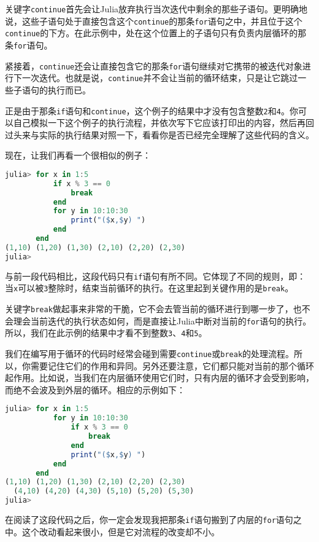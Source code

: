 关键字\verb`continue`首先会让Julia放弃执行当次迭代中剩余的那些子语句。更明确地说，这些子语句处于直接包含这个\verb`continue`的那条\verb`for`语句之中，并且位于这个\verb`continue`的下方。在此示例中，处在这个位置上的子语句只有负责内层循环的那条\verb`for`语句。

紧接着，\verb`continue`还会让直接包含它的那条\verb`for`语句继续对它携带的被迭代对象进行下一次迭代。也就是说，\verb`continue`并不会让当前的循环结束，只是让它跳过一些子语句的执行而已。

正是由于那条\verb`if`语句和\verb`continue`，这个例子的结果中才没有包含整数\verb`2`和\verb`4`。你可以自己模拟一下这个例子的执行流程，并依次写下它应该打印出的内容，然后再回过头来与实际的执行结果对照一下，看看你是否已经完全理解了这些代码的含义。

现在，让我们再看一个很相似的例子：
\begin{lstlisting}[language=julia]
julia> for x in 1:5
           if x % 3 == 0
               break
           end
           for y in 10:10:30
               print("($x,$y) ")
           end
       end
(1,10) (1,20) (1,30) (2,10) (2,20) (2,30) 
julia> 
\end{lstlisting}

与前一段代码相比，这段代码只有\verb`if`语句有所不同。它体现了不同的规则，即：当\verb`x`可以被\verb`3`整除时，结束当前循环的执行。在这里起到关键作用的是\verb`break`。

关键字\verb`break`做起事来非常的干脆，它不会去管当前的循环进行到哪一步了，也不会理会当前迭代的执行状态如何，而是直接让Julia中断对当前的\verb`for`语句的执行。所以，我们在此示例的结果中才看不到整数\verb`3`、\verb`4`和\verb`5`。

我们在编写用于循环的代码时经常会碰到需要\verb`continue`或\verb`break`的处理流程。所以，你需要记住它们的作用和异同。另外还要注意，它们都只能对当前的那个循环起作用。比如说，当我们在内层循环使用它们时，只有内层的循环才会受到影响，而绝不会波及到外层的循环。相应的示例如下：
\begin{lstlisting}[language=julia]
julia> for x in 1:5
           for y in 10:10:30
               if x % 3 == 0 
                   break
               end
               print("($x,$y) ")
           end
       end
(1,10) (1,20) (1,30) (2,10) (2,20) (2,30)
  (4,10) (4,20) (4,30) (5,10) (5,20) (5,30) 
julia> 
\end{lstlisting}

在阅读了这段代码之后，你一定会发现我把那条\verb`if`语句搬到了内层的\verb`for`语句之中。这个改动看起来很小，但是它对流程的改变却不小。

